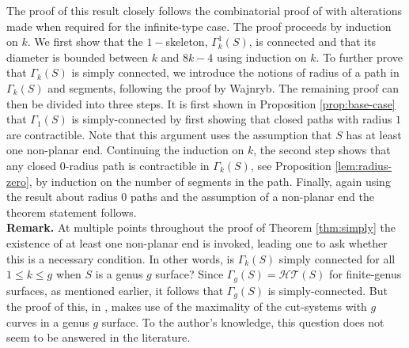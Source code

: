 \documentclass[11pt]{article}
\begin{document}
The proof of this result closely follows the combinatorial proof of \cite{wajnryb} with alterations made when required for the infinite-type case. The proof proceeds by induction on $k$. We first show that the $1-$skeleton, $\Gamma^1_k(S)$, is connected and that its diameter is bounded between $k$ and $8k-4$ using induction on $k$. To further prove that $\Gamma_k(S)$ is simply connected, we introduce the notions of radius of a path in $\Gamma_k(S)$ and segments, following the proof by Wajnryb. The remaining proof can then be divided into three steps. It is first shown in Proposition \ref{prop:base-case} that $\Gamma_1(S)$ is simply-connected by first showing that closed paths with radius $1$ are contractible. Note that this argument uses the assumption that $S$ has at least one non-planar end. Continuing the induction on $k$, the second step shows that any closed 0-radius path is contractible in $\Gamma_k(S)$, see Proposition \ref{lem:radius-zero}, by induction on the number of segments in the path. Finally, again using the result about radius $0$ paths and the assumption of a non-planar end the theorem statement follows.\\

\textbf{Remark.} At multiple points throughout the proof of Theorem \ref{thm:simply} the existence of at least one non-planar end is invoked, leading one to ask whether this is a necessary condition. In other words, is $\Gamma_k(S)$ simply connected for all $1\leq k \leq g$ when $S$ is a genus $g$ surface? Since $\Gamma_g(S) = \mathcal{HT}(S)$ for finite-genus surfaces, as mentioned earlier, it follows that $\Gamma_g(S)$ is simply-connected. But the proof of this, in \cite{wajnryb, hatcher}, makes use of the maximality of the cut-systems with $g$ curves in a genus $g$ surface. To the author's knowledge, this question does not seem to be answered in the literature.\\
\end{document}
